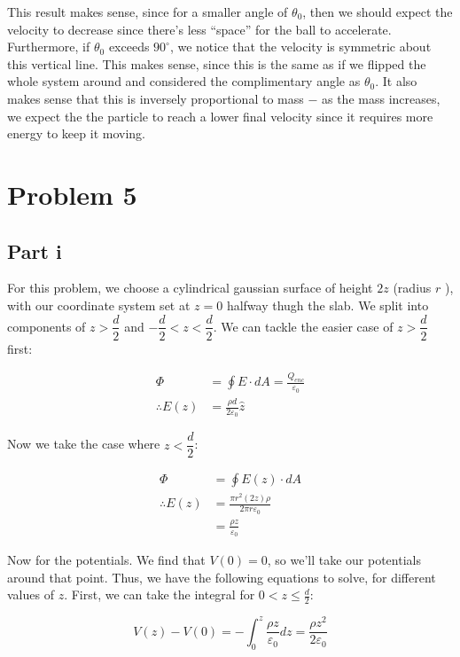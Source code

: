 \documentclass{article}
\theoremstyle{definition}
\numberwithin{equation}{section}
\numberwithin{definition}{section}
\begin{document}
    This result makes sense, since for a smaller angle of $\theta_0$, then we should expect the velocity to decrease since there's less ``space'' for the ball to accelerate. Furthermore, if $\theta_0$ exceeds $90^\circ$, we notice that the velocity is symmetric about this vertical line. This makes sense, since this is the same as if we flipped the whole system around and considered the complimentary angle as $\theta_0$. It also makes sense that this is inversely proportional to mass $-$ as the mass increases, we expect the the particle to reach a lower final velocity since it requires more energy to keep it moving.

    \section{Problem 5}

    \subsection{Part i}

    For this problem, we choose a cylindrical gaussian surface of height $2z$ (radius $r$ ), with our coordinate system set at $z=0$ halfway thugh the slab. We split into components of $z > \dfrac d 2$ and $-\dfrac d 2 < z < \dfrac d 2$. We can tackle the easier case of $z > \dfrac d 2$ first:

    \begin{align*}
        \Phi &= \oint E \cdot dA  = \frac{Q_{enc}}{\varepsilon_0}\\
        \therefore E(z) &= \frac{\rho d}{2\varepsilon_0} \hat z
    \end{align*}
    
    Now we take the case where $z < \dfrac d 2$:

    \begin{align*}
        \Phi &= \oint E(z) \cdot dA \\
        \therefore E(z) &= \frac{\pi r^2 (2z)\rho}{2\pi r \varepsilon_0}\\
        &= \frac{\rho z}{\varepsilon_0}
    \end{align*}


    Now for the potentials. We find that $V(0) = 0$, so we'll take our potentials around that point. Thus, we have the following equations to solve, for different values of $z$. First, we can take the integral for $0 < z \le \frac{d}{2}$:

   \[ V(z) - V(0) = - \int_0^z \frac{\rho z}{\varepsilon_0} dz = \frac{\rho z^2}{2\varepsilon_0}    \]
\end{document}

